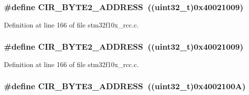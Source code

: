 \subsubsection[{\texorpdfstring{C\+I\+R\+\_\+\+B\+Y\+T\+E2\+\_\+\+A\+D\+D\+R\+E\+SS}{CIR_BYTE2_ADDRESS}}]{\setlength{\rightskip}{0pt plus 5cm}\#define C\+I\+R\+\_\+\+B\+Y\+T\+E2\+\_\+\+A\+D\+D\+R\+E\+SS~(({\bf uint32\+\_\+t})0x40021009)}\hypertarget{group___r_c_c___private___defines_gaab58c3f3f81bf1ab9a14cf3fececd8c4}{}\label{group___r_c_c___private___defines_gaab58c3f3f81bf1ab9a14cf3fececd8c4}


Definition at line 166 of file stm32f10x\+\_\+rcc.\+c.

\subsubsection[{\texorpdfstring{C\+I\+R\+\_\+\+B\+Y\+T\+E2\+\_\+\+A\+D\+D\+R\+E\+SS}{CIR_BYTE2_ADDRESS}}]{\setlength{\rightskip}{0pt plus 5cm}\#define C\+I\+R\+\_\+\+B\+Y\+T\+E2\+\_\+\+A\+D\+D\+R\+E\+SS~(({\bf uint32\+\_\+t})0x40021009)}\hypertarget{group___r_c_c___private___defines_gaab58c3f3f81bf1ab9a14cf3fececd8c4}{}\label{group___r_c_c___private___defines_gaab58c3f3f81bf1ab9a14cf3fececd8c4}


Definition at line 166 of file stm32f10x\+\_\+rcc.\+c.

\subsubsection[{\texorpdfstring{C\+I\+R\+\_\+\+B\+Y\+T\+E3\+\_\+\+A\+D\+D\+R\+E\+SS}{CIR_BYTE3_ADDRESS}}]{\setlength{\rightskip}{0pt plus 5cm}\#define C\+I\+R\+\_\+\+B\+Y\+T\+E3\+\_\+\+A\+D\+D\+R\+E\+SS~(({\bf uint32\+\_\+t})0x4002100\+A)}\hypertarget{group___r_c_c___private___defines_ga43f47430582c9575970901533e525bb5}{}\label{group___r_c_c___private___defines_ga43f47430582c9575970901533e525bb5}


